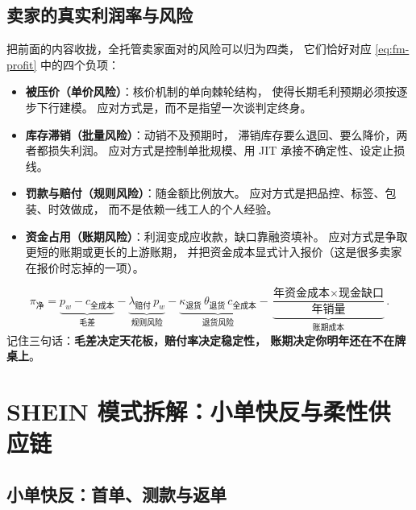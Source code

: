 \subsection{卖家的真实利润率与风险}

把前面的内容收拢，全托管卖家面对的风险可以归为四类，
它们恰好对应 \cref{eq:fm-profit} 中的四个负项：

\begin{itemize}
  \item \textbf{被压价（单价风险）}：核价机制的单向棘轮结构，
        使得长期毛利预期必须按逐步下行建模。
        应对方式是，而不是指望一次谈判定终身。
  \item \textbf{库存滞销（批量风险）}：动销不及预期时，
        滞销库存要么退回、要么降价，两者都损失利润。
        应对方式是控制单批规模、用 JIT 承接不确定性、设定止损线。
  \item \textbf{罚款与赔付（规则风险）}：随金额比例放大。
        应对方式是把品控、标签、包装、时效做成，
        而不是依赖一线工人的个人经验。
  \item \textbf{资金占用（账期风险）}：利润变成应收款，缺口靠融资填补。
        应对方式是争取更短的账期或更长的上游账期，
        并把资金成本显式计入报价（这是很多卖家在报价时忘掉的一项）。
\end{itemize}

\begin{formulacard}
\begin{equation}
\pi_{\text{净}}
= \underbrace{p_{w} - c_{\text{全成本}}}_{\text{毛差}}
- \underbrace{\lambda_{\text{赔付}}\, p_{w}}_{\text{规则风险}}
- \underbrace{\kappa_{\text{退货}}\, \theta_{\text{退货}}\, c_{\text{全成本}}}_{\text{退货风险}}
- \underbrace{\frac{\text{年资金成本} \times \text{现金缺口}}{\text{年销量}}}_{\text{账期成本}} .
\label{eq:fm-net}
\end{equation}
记住三句话：\textbf{毛差决定天花板，赔付率决定稳定性，
账期决定你明年还在不在牌桌上}。
\end{formulacard}

\section{SHEIN 模式拆解：小单快反与柔性供应链}
\label{sec:plat-shein}

\subsection{小单快反：首单、测款与返单}

